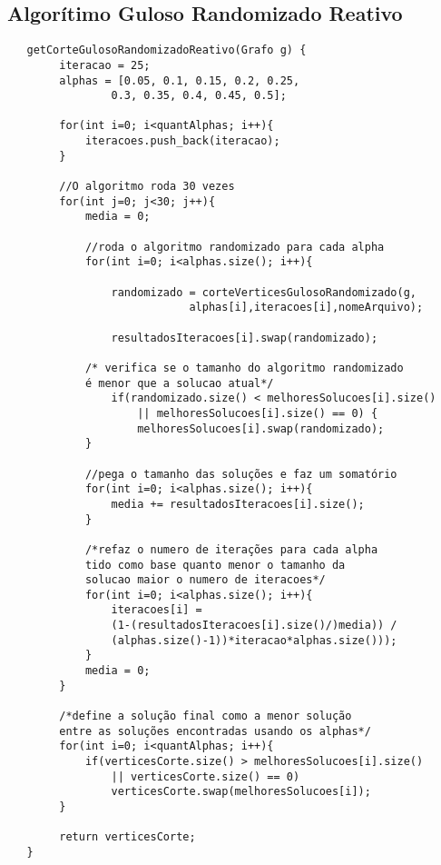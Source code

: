 \documentclass[a4paper, 12pt]{article}
\begin{document}
\subsection{Algorítimo Guloso Randomizado Reativo}

\begin{lstlisting} 
   getCorteGulosoRandomizadoReativo(Grafo g) {
        iteracao = 25;
        alphas = [0.05, 0.1, 0.15, 0.2, 0.25, 
                0.3, 0.35, 0.4, 0.45, 0.5];
        
        for(int i=0; i<quantAlphas; i++){
            iteracoes.push_back(iteracao);
        }
    
        //O algoritmo roda 30 vezes
        for(int j=0; j<30; j++){
            media = 0;
        
            //roda o algoritmo randomizado para cada alpha
            for(int i=0; i<alphas.size(); i++){
            
                randomizado = corteVerticesGulosoRandomizado(g,
                            alphas[i],iteracoes[i],nomeArquivo);
            
                resultadosIteracoes[i].swap(randomizado);
            
            /* verifica se o tamanho do algoritmo randomizado
            é menor que a solucao atual*/
                if(randomizado.size() < melhoresSolucoes[i].size()
                    || melhoresSolucoes[i].size() == 0) {
                    melhoresSolucoes[i].swap(randomizado);
            }
        
            //pega o tamanho das soluções e faz um somatório
            for(int i=0; i<alphas.size(); i++){
                media += resultadosIteracoes[i].size();
            }
        
            /*refaz o numero de iterações para cada alpha
            tido como base quanto menor o tamanho da
            solucao maior o numero de iteracoes*/
            for(int i=0; i<alphas.size(); i++){
                iteracoes[i] =  
                (1-(resultadosIteracoes[i].size()/)media)) / 
                (alphas.size()-1))*iteracao*alphas.size()));
            }
            media = 0;
        }
    
        /*define a solução final como a menor solução
        entre as soluções encontradas usando os alphas*/
        for(int i=0; i<quantAlphas; i++){
            if(verticesCorte.size() > melhoresSolucoes[i].size()
                || verticesCorte.size() == 0)
                verticesCorte.swap(melhoresSolucoes[i]);
        }
        
        return verticesCorte;
   }
 \end{lstlisting}
\end{document}
